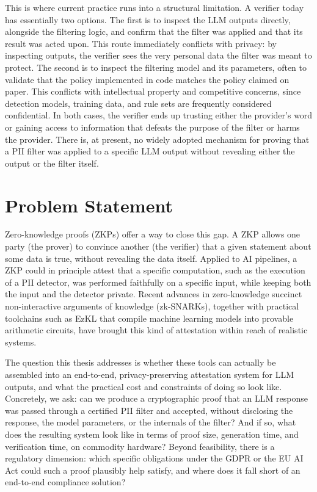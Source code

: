 This is where current practice runs into a structural limitation. A verifier today has essentially two options. The first is to inspect the LLM outputs directly, alongside the filtering logic, and confirm that the filter was applied and that its result was acted upon. This route immediately conflicts with privacy: by inspecting outputs, the verifier sees the very personal data the filter was meant to protect. The second is to inspect the filtering model and its parameters, often to validate that the policy implemented in code matches the policy claimed on paper. This conflicts with intellectual property and competitive concerns, since detection models, training data, and rule sets are frequently considered confidential. In both cases, the verifier ends up trusting either the provider's word or gaining access to information that defeats the purpose of the filter or harms the provider. There is, at present, no widely adopted mechanism for proving that a PII filter was applied to a specific LLM output without revealing either the output or the filter itself.

\section{Problem Statement}
\label{sec:problem-statement}

Zero-knowledge proofs (ZKPs) offer a way to close this gap. A ZKP allows one party (the prover) to convince another (the verifier) that a given statement about some data is true, without revealing the data itself. Applied to AI pipelines, a ZKP could in principle attest that a specific computation, such as the execution of a PII detector, was performed faithfully on a specific input, while keeping both the input and the detector private. Recent advances in zero-knowledge succinct non-interactive arguments of knowledge (zk-SNARKs), together with practical toolchains such as EzKL that compile machine learning models into provable arithmetic circuits, have brought this kind of attestation within reach of realistic systems.

\medskip

The question this thesis addresses is whether these tools can actually be assembled into an end-to-end, privacy-preserving attestation system for LLM outputs, and what the practical cost and constraints of doing so look like. Concretely, we ask: can we produce a cryptographic proof that an LLM response was passed through a certified PII filter and accepted, without disclosing the response, the model parameters, or the internals of the filter? And if so, what does the resulting system look like in terms of proof size, generation time, and verification time, on commodity hardware? Beyond feasibility, there is a regulatory dimension: which specific obligations under the GDPR or the EU AI Act could such a proof plausibly help satisfy, and where does it fall short of an end-to-end compliance solution?

